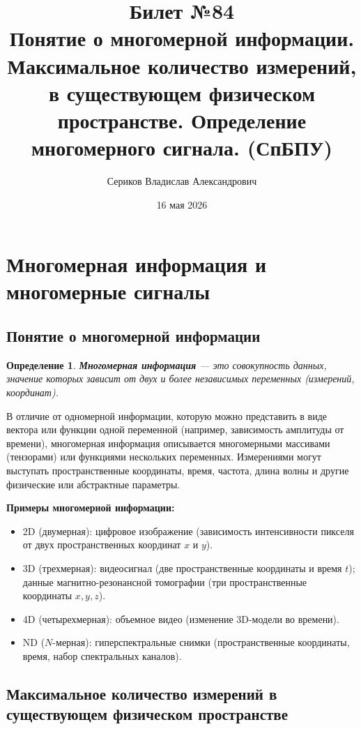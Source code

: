 \documentclass[12pt,a4paper]{article}
\title{Билет №84 \\ \small Понятие о многомерной информации. Максимальное количество измерений, в существующем физическом пространстве. Определение многомерного сигнала. (СпБПУ)}
\author{Сериков Владислав Александрович}
\date{16 мая 2026}
\newtheorem{definition}{Определение}
\begin{document}
\maketitle
\tableofcontents
\newpage

\section{Многомерная информация и многомерные сигналы}

\subsection{Понятие о многомерной информации}

\begin{definition}
\textbf{Многомерная информация} — это совокупность данных, значение которых зависит от двух и более независимых переменных (измерений, координат).
\end{definition}

В отличие от одномерной информации, которую можно представить в виде вектора или функции одной переменной (например, зависимость амплитуды от времени), многомерная информация описывается многомерными массивами (тензорами) или функциями нескольких переменных. Измерениями могут выступать пространственные координаты, время, частота, длина волны и другие физические или абстрактные параметры.

\textbf{Примеры многомерной информации:}
\begin{itemize}
    \item 2D (двумерная): цифровое изображение (зависимость интенсивности пикселя от двух пространственных координат $x$ и $y$).
    \item 3D (трехмерная): видеосигнал (две пространственные координаты и время $t$); данные магнитно-резонансной томографии (три пространственные координаты $x, y, z$).
    \item 4D (четырехмерная): объемное видео (изменение 3D-модели во времени).
    \item ND ($N$-мерная): гиперспектральные снимки (пространственные координаты, время, набор спектральных каналов).
\end{itemize}

\subsection{Максимальное количество измерений в существующем физическом пространстве}
\end{document}
